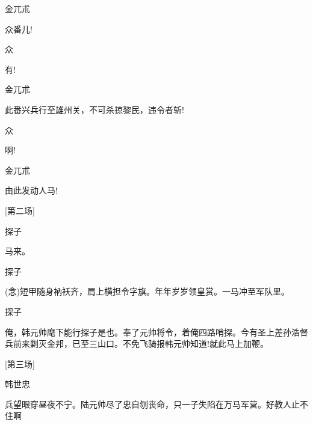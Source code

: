 {金兀朮\hspace{20pt}~

众番儿!}

{众\hspace{40pt}~

有!}

{金兀朮\hspace{20pt}~

此番兴兵行至雄州关，不可杀掠黎民，违令者斩!}

{众\hspace{40pt}~

啊!}

{金兀朮\hspace{20pt}~

由此发动人马!}

{{[}第二场{]}}

{探子\hspace{30pt}~

马来。}

{探子

({\akai 念})短甲随身衲袄齐，肩上横担令字旗。年年岁岁领皇赏。一马冲至军队里。}

{探子

俺，韩元帅麾下能行探子是也。奉了元帅将令，着俺四路哨探。今有圣上差孙浩督兵前来剿灭金邦，已至三山口。不免飞骑报韩元帅知道!就此马上加鞭。}

{{[}第三场{]}}

{韩世忠

兵望眼穿昼夜不宁。陆元帅尽了忠自刎丧命，只一子失陷在万马军营。好教人止不住啊 }


